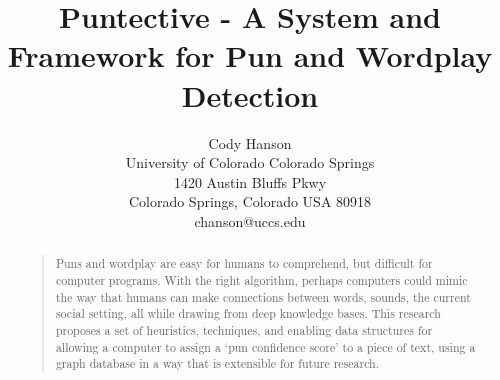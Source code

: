 \documentclass[letterpaper]{article}
\begin{document}
\title{Puntective - A System and Framework for Pun and Wordplay Detection}
\author{Cody Hanson\\
University of Colorado Colorado Springs\\
1420 Austin Bluffs Pkwy\\
Colorado Springs, Colorado USA 80918\\
chanson@uccs.edu}
\maketitle
\begin{abstract}
\begin{quote}
Puns and wordplay are easy for humans to comprehend, but difficult for computer programs.
With the right algorithm, perhaps computers could mimic the way that humans can make connections between words, sounds, the current social setting, all while drawing from deep knowledge bases. 
This research proposes a set of heuristics, techniques, and enabling data structures for allowing a computer to assign a `pun confidence score' to a piece of text, using a graph database in a way that is extensible for future research.
\end{quote}
\end{abstract}









 

\end{document}
